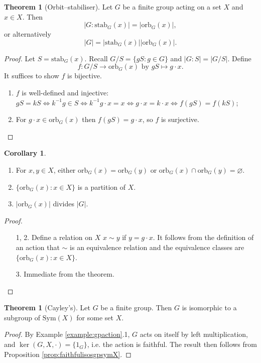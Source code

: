\documentclass[a4paper]{article}
\newcommand{\orb}{\text{orb}}
\newcommand{\stab}{\text{stab}}
\newcommand{\Sym}{\text{Sym}}
\theoremstyle{definition}
\newtheorem{thm}[defn]{Theorem}
\newtheorem{coro}[defn]{Corollary}
\begin{document}
\begin{thm}[Orbit–stabiliser]
Let $G$ be a finite group acting on a set $X$ and $x\in X$. Then
\[
|G:\stab_G(x)|=|\orb_G(x)|,
\]
or alternatively
\[
|G|=|\stab_G(x)||\orb_G(x)|.
\]
\end{thm}
\begin{proof}
Let $S=\stab_G(x)$. Recall $G/S=\{gS:g\in G\}$ and $|G:S|=|G/S|$. Define
\[
f:G/S\rightarrow\orb_G(x) \text{ by } gS\mapsto g\cdot x.
\]
It suffices to show $f$ is bijective.
\begin{enumerate}
\item $f$ is well-defined and injective: $gS=kS\Leftrightarrow k^{-1}g\in S \Leftrightarrow k^{-1}g\cdot x=x \Leftrightarrow g\cdot x=k\cdot x\Leftrightarrow f(gS)=f(kS)$;
\item For $g\cdot x\in\orb_G(x)$ then $f(gS)=g\cdot x$, so $f$ is surjective.
\end{enumerate}
\end{proof}

\begin{coro}
\label{coro:orbpartitionX}
\begin{enumerate}
\item For $x,y\in X$, either $\orb_G(x)=\orb_G(y)$ or $\orb_G(x)\cap \orb_G(y)=\varnothing$.
\item $\{\orb_G(x):x\in X\}$ is a partition of $X$.
\item $|\orb_G(x)|$ divides $|G|$.
\end{enumerate}
\end{coro}
\begin{proof}
\begin{enumerate}
\item[1, 2.] Define a relation on $X$ $x\sim y$ if $y=g\cdot x$. It follows from the definition of an action that $\sim$ is an equivalence relation and the equivalence classes are $\{\orb_G(x):x\in X\}$.
\item[3.] Immediate from the theorem.
\end{enumerate}
\end{proof}

\begin{thm}[Cayley's]
Let $G$ be a finite group. Then $G$ is isomorphic to a subgroup of $\Sym(X)$ for some set $X$.
\end{thm}
\begin{proof}
By Example \ref{example:gpaction}.1, $G$ acts on itself by left multiplication, and $\ker(G,X,\cdot)=\{1_G\}$, i.e. the action is faithful. The result then follows from Proposition \ref{prop:faithfulisosgpsymX}.
\end{proof}
\end{document}
